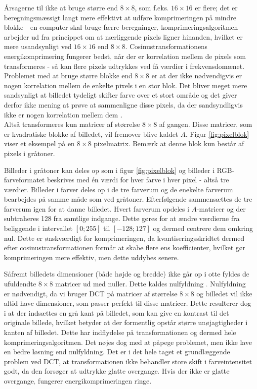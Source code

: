 Årsagerne til ikke at bruge større end $8 \times 8$, som f.eks. $16\times16$ er flere; det er beregningsmæssigt langt mere effektivt at udføre komprimeringen på mindre blokke - en computer skal bruge færre beregninger, komprimeringsalgoritmen arbejder ud fra princippet om at nærliggende pixels ligner hinanden, hvilket er mere usandsynligt ved $16 \times 16$ end $8 \times 8$. Cosinustransformationens energikomprimering fungerer bedst, når der er korrelation mellem de pixels som transformeres - så kan flere pixels udtrykkes ved få værdier i frekvensdomænet. Problemet med at bruge større blokke end $8\times8$ er at der ikke nødvendigvis er nogen korrelation mellem de enkelte pixels i en stor blok. Det bliver meget mere sandsynligt at billedet tydeligt skifter farve over et stort område og det giver derfor ikke mening at prøve at sammenligne disse pixels, da der sandsyndligvis ikke er nogen korrelation mellem dem \citep{guillermo_sapiro}.\\
Altså transformeres kun matricer af størrelse $8\times8$ af gangen. Disse matricer, som er kvadratiske blokke af billedet, vil fremover blive kaldet $A$. Figur \vref{fig:pixelblok} viser et eksempel på en $8 \times 8$ pixelmatrix. Bemærk at denne blok kun består af pixels i gråtoner.

Billeder i gråtoner kan deles op som i figur \vref{fig:pixelblok} og billeder i RGB-farveformatet beskrives med én værdi for hver farve i hver pixel - altså tre værdier. Billeder i farver deles op i de tre farverum og de enekelte farverum bearbejdes på samme måde som ved gråtoner. Efterfølgende sammensættes de tre farverum igen for at danne billedet.
Hvert farverum opdeles i $A$-matricer og der subtraheres 128 fra samtlige indgange. Dette gøres for at ændre værdierne fra beliggende i intervallet $[0;255]$ til $[-128;127]$ og dermed centrere dem omkring nul. Dette er ønskværdigt for komprimeringen, da kvantiseringsskridtet dermed efter cosinustransformationen formår at skabe flere ens koefficienter, hvilket gør komprimeringen mere effektiv, men dette uddybes senere.

Såfremt billedets dimensioner (både højde og bredde) ikke går op i otte fyldes de ufuldendte $8 \times 8$ matricer ud med nuller. Dette kaldes nulfyldning \citep{zero_padding}. Nulfyldning er nødvendigt, da vi bruger DCT på matricer af størrelse $8\times8$ og billedet vil ikke altid have dimensioner, som passer perfekt til disse matricer. Dette resulterer dog i at der indsættes en grå kant på billedet, som kan give en kontrast til det originale billede, hvilket betyder at der formentlig opstår større unøjagtigheder i kanten af billedet. Dette har indflydelse på transformationen og dermed hele komprimeringsalgoritmen. Det nøjes dog med at påpege problemet, men ikke lave en bedre løsning end nulfyldning. Det er i det hele taget et grundlæggende problem ved DCT, at transformationen ikke behandler store skift i farveintensitet godt, da den forsøger at udtrykke glatte overgange. Hvis der ikke er glatte overgange, fungerer energikomprimeringen ringe.

